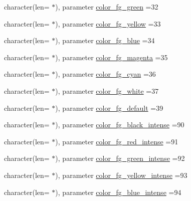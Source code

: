 \begin{DoxyCompactItemize}
\item 
character(len= $\ast$), parameter \mbox{\hyperlink{namespacem__escape_aeab9b03c1de2c6fb13031c9ca55f9105}{color\+\_\+fg\+\_\+green}} =\textquotesingle{}32\textquotesingle{}
\item 
character(len= $\ast$), parameter \mbox{\hyperlink{namespacem__escape_accc5b67f05d8a2b02ca6f4a0ba38e581}{color\+\_\+fg\+\_\+yellow}} =\textquotesingle{}33\textquotesingle{}
\item 
character(len= $\ast$), parameter \mbox{\hyperlink{namespacem__escape_a01075e619c6af06aac80d73f32263439}{color\+\_\+fg\+\_\+blue}} =\textquotesingle{}34\textquotesingle{}
\item 
character(len= $\ast$), parameter \mbox{\hyperlink{namespacem__escape_ac56b264a4d6c5f3668bac32b791e54de}{color\+\_\+fg\+\_\+magenta}} =\textquotesingle{}35\textquotesingle{}
\item 
character(len= $\ast$), parameter \mbox{\hyperlink{namespacem__escape_a0bbc85c7110c9b67456884baafe31daf}{color\+\_\+fg\+\_\+cyan}} =\textquotesingle{}36\textquotesingle{}
\item 
character(len= $\ast$), parameter \mbox{\hyperlink{namespacem__escape_ae410339e5c6b5468a65e8ce193941ea4}{color\+\_\+fg\+\_\+white}} =\textquotesingle{}37\textquotesingle{}
\item 
character(len= $\ast$), parameter \mbox{\hyperlink{namespacem__escape_aaeff9968bb1e29198469d5d8109e5f41}{color\+\_\+fg\+\_\+default}} =\textquotesingle{}39\textquotesingle{}
\item 
character(len= $\ast$), parameter \mbox{\hyperlink{namespacem__escape_a75d8856bae4a4b8875d48ce2e3a3409a}{color\+\_\+fg\+\_\+black\+\_\+intense}} =\textquotesingle{}90\textquotesingle{}
\item 
character(len= $\ast$), parameter \mbox{\hyperlink{namespacem__escape_a9355532fa2ee17b47e72208480a86707}{color\+\_\+fg\+\_\+red\+\_\+intense}} =\textquotesingle{}91\textquotesingle{}
\item 
character(len= $\ast$), parameter \mbox{\hyperlink{namespacem__escape_a21c7f9b0377ba62dc353e09c05cc5f35}{color\+\_\+fg\+\_\+green\+\_\+intense}} =\textquotesingle{}92\textquotesingle{}
\item 
character(len= $\ast$), parameter \mbox{\hyperlink{namespacem__escape_a7fb2b231cf28bd2ffbf015d7430b46db}{color\+\_\+fg\+\_\+yellow\+\_\+intense}} =\textquotesingle{}93\textquotesingle{}
\item 
character(len= $\ast$), parameter \mbox{\hyperlink{namespacem__escape_a57cc52b1beef27fae861cae6448221fe}{color\+\_\+fg\+\_\+blue\+\_\+intense}} =\textquotesingle{}94\textquotesingle{}

\end{DoxyCompactItemize}
